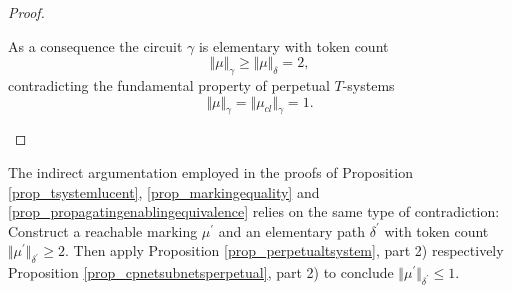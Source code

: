 \documentclass{fundam}
\begin{document}
\begin{proof}
\begin{enumerate}
\noindent As a consequence the circuit $\gamma$ is elementary with token count
$$\Vert \mu \Vert_{\gamma} \geq \Vert \mu \Vert_\delta = 2,$$
contradicting the fundamental property of perpetual $T$-systems
$$\Vert \mu \Vert_\gamma = \Vert \mu_{cl} \Vert_\gamma =1.$$
\end{enumerate}

\vspace*{-12mm}
\end{proof}
\noindent
The indirect argumentation employed in the proofs of Proposition \ref{prop_tsystemlucent}, \ref{prop_markingequality} and \ref{prop_propagatingenablingequivalence} relies on the same type of contradiction: Construct a reachable marking $\mu^\prime$ and an elementary path $\delta^\prime$ with token \mbox{count $\Vert \mu^\prime \Vert_{\delta^\prime}\geq 2$}. Then apply Proposition \ref{prop_perpetualtsystem}, part 2) respectively Proposition \ref{prop_cpnetsubnetsperpetual}, part 2) to conclude
$\Vert \mu^\prime \Vert_{\delta^\prime}\leq 1$.
\end{document}
